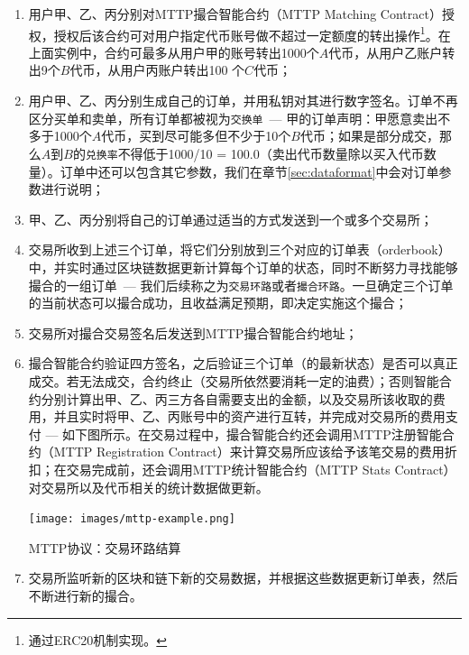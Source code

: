\documentclass[UTF8,nofonts]{ctexart}
\makeatletter
\newenvironment{figurehere}
  {\def\@captype{figure}}
  {}
\makeatother
\begin{document}
\begin{enumerate}
  \item 用户甲、乙、丙分别对MTTP撮合智能合约（MTTP Matching Contract）授权，授权后该合约可对用户指定代币账号做不超过一定额度的转出操作\footnote{通过ERC20机制实现。}。在上面实例中，合约可最多从用户甲的账号转出1000个$A$代币，从用户乙账户转出9个$B$代币，从用户丙账户转出100 个$C$代币；
  \item 用户甲、乙、丙分别生成自己的订单，并用私钥对其进行数字签名。订单不再区分买单和卖单，所有订单都被视为\texttt{交换单}\ --- 甲的订单声明：甲愿意卖出不多于1000个$A$代币，买到尽可能多但不少于10个$B$代币；如果是部分成交，那么$A$到$B$的\texttt{兑换率}不得低于1000/10 = 100.0（卖出代币数量除以买入代币数量）。订单中还可以包含其它参数，我们在章节\ref{sec:dataformat}中会对订单参数进行说明；
  \item 甲、乙、丙分别将自己的订单通过适当的方式发送到一个或多个交易所；
  \item 交易所收到上述三个订单，将它们分别放到三个对应的订单表（orderbook）中，并实时通过区块链数据更新计算每个订单的状态，同时不断努力寻找能够撮合的一组订单\ --- 我们后续称之为\texttt{交易环路}或者\texttt{撮合环路}。一旦确定三个订单的当前状态可以撮合成功，且收益满足预期，即决定实施这个撮合；
  \item 交易所对撮合交易签名后发送到MTTP撮合智能合约地址；
  \item 撮合智能合约验证四方签名，之后验证三个订单（的最新状态）是否可以真正成交。若无法成交，合约终止（交易所依然要消耗一定的油费）；否则智能合约分别计算出甲、乙、丙三方各自需要支出的金额，以及交易所该收取的费用，并且实时将甲、乙、丙账号中的资产进行互转，并完成对交易所的费用支付 --- 如下图所示。在交易过程中，撮合智能合约还会调用MTTP注册智能合约（MTTP Registration Contract）来计算交易所应该给予该笔交易的费用折扣；在交易完成前，还会调用MTTP统计智能合约（MTTP Stats Contract）对交易所以及代币相关的统计数据做更新。

\begin{center}
\begin{figurehere}
\texttt{[image: images/mttp-example.png]}
\caption{MTTP协议：交易环路结算}
\label{fig:MTTPprotocol}
\end{figurehere}
\end{center}
  
  \item 交易所监听新的区块和链下新的交易数据，并根据这些数据更新订单表，然后不断进行新的撮合。
\end{enumerate}
\end{document}
